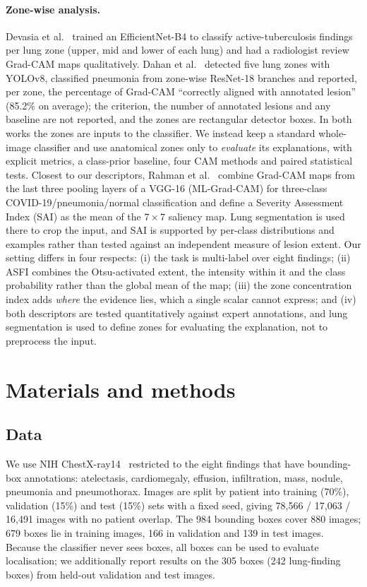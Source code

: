 \documentclass[pdflatex,sn-mathphys-num]{sn-jnl}
\begin{document}
\paragraph{Zone-wise analysis.} Devasia et al.~\cite{tbzones2023scirep} trained an EfficientNet-B4 to classify active-tuberculosis findings per lung zone (upper, mid and lower of each lung) and had a radiologist review Grad-CAM maps qualitatively. Dahan et al.~\cite{zoneaware2026pneumonia} detected five lung zones with YOLOv8, classified pneumonia from zone-wise ResNet-18 branches and reported, per zone, the percentage of Grad-CAM ``correctly aligned with annotated lesion'' (85.2\% on average); the criterion, the number of annotated lesions and any baseline are not reported, and the zones are rectangular detector boxes. In both works the zones are inputs to the classifier. We instead keep a standard whole-image classifier and use anatomical zones only to \emph{evaluate} its explanations, with explicit metrics, a class-prior baseline, four CAM methods and paired statistical tests. Closest to our descriptors, Rahman et al.~\cite{rahman2024sai} combine Grad-CAM maps from the last three pooling layers of a VGG-16 (ML-Grad-CAM) for three-class COVID-19/pneumonia/normal classification and define a Severity Assessment Index (SAI) as the mean of the $7\times7$ saliency map. Lung segmentation is used there to crop the input, and SAI is supported by per-class distributions and examples rather than tested against an independent measure of lesion extent. Our setting differs in four respects: (i) the task is multi-label over eight findings; (ii) ASFI combines the Otsu-activated extent, the intensity within it and the class probability rather than the global mean of the map; (iii) the zone concentration index adds \emph{where} the evidence lies, which a single scalar cannot express; and (iv) both descriptors are tested quantitatively against expert annotations, and lung segmentation is used to define zones for evaluating the explanation, not to preprocess the input.

\section{Materials and methods}\label{sec:methods}

\subsection{Data}
We use NIH ChestX-ray14~\cite{wang2017chestxray8} restricted to the eight findings that have bounding-box annotations: atelectasis, cardiomegaly, effusion, infiltration, mass, nodule, pneumonia and pneumothorax. Images are split by patient into training (70\%), validation (15\%) and test (15\%) sets with a fixed seed, giving 78,566 / 17,063 / 16,491 images with no patient overlap. The 984 bounding boxes cover 880 images; 679 boxes lie in training images, 166 in validation and 139 in test images. Because the classifier never sees boxes, all boxes can be used to evaluate localisation; we additionally report results on the 305 boxes (242 lung-finding boxes) from held-out validation and test images.
\end{document}
